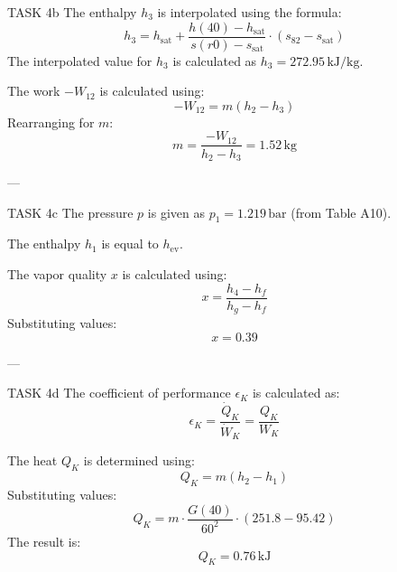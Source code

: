 TASK 4b  
The enthalpy \( h_3 \) is interpolated using the formula:  
\[
h_3 = h_{\text{sat}} + \frac{h(40) - h_{\text{sat}}}{s(r0) - s_{\text{sat}}} \cdot (s_{82} - s_{\text{sat}})
\]  
The interpolated value for \( h_3 \) is calculated as \( h_3 = 272.95 \, \text{kJ/kg} \).  

The work \( -W_{12} \) is calculated using:  
\[
-W_{12} = m(h_2 - h_3)
\]  
Rearranging for \( m \):  
\[
m = \frac{-W_{12}}{h_2 - h_3} = 1.52 \, \text{kg}
\]  

---

TASK 4c  
The pressure \( p \) is given as \( p_1 = 1.219 \, \text{bar} \) (from Table A10).  

The enthalpy \( h_1 \) is equal to \( h_{\text{ev}} \).  

The vapor quality \( x \) is calculated using:  
\[
x = \frac{h_4 - h_f}{h_g - h_f}
\]  
Substituting values:  
\[
x = 0.39
\]  

---

TASK 4d  
The coefficient of performance \( \epsilon_K \) is calculated as:  
\[
\epsilon_K = \frac{\dot{Q}_K}{\dot{W}_K} = \frac{Q_K}{W_K}
\]  

The heat \( Q_K \) is determined using:  
\[
Q_K = m(h_2 - h_1)
\]  
Substituting values:  
\[
Q_K = m \cdot \frac{G(40)}{60^2} \cdot (251.8 - 95.42)
\]  
The result is:  
\[
Q_K = 0.76 \, \text{kJ}
\]